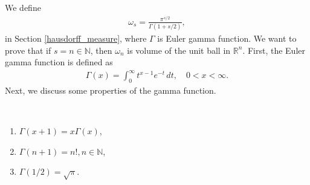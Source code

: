 We define
\begin{align*}
    \omega_s = \frac{\pi^{s/2}}{\Gamma(1 + s/2)},
\end{align*}
in Section \ref{hausdorff_measure}, where $\Gamma$ is Euler gamma function. We want to prove that if $s = n \in \mathbb{N}$, then $\omega_n$ is volume of the unit ball in $\mathbb{R}^n$. First, the Euler gamma function is defined as
\begin{align*}
    \Gamma(x) = \int^\infty_{0} t^{x-1} e^{-t}\, dt, \quad 0 < x <\infty.
\end{align*}
Next, we discuss some properties of the gamma function.

\medskip

\begin{theorem}
~\begin{enumerate}[label=(\alph*)]
    \item $\Gamma(x+1) = x \Gamma(x)$,
    
    \item $\Gamma(n+1) = n!, n \in \mathbb{N}$,
    
    \item $\Gamma(1/2) = \sqrt{\pi}$.
\end{enumerate}
\end{theorem}
